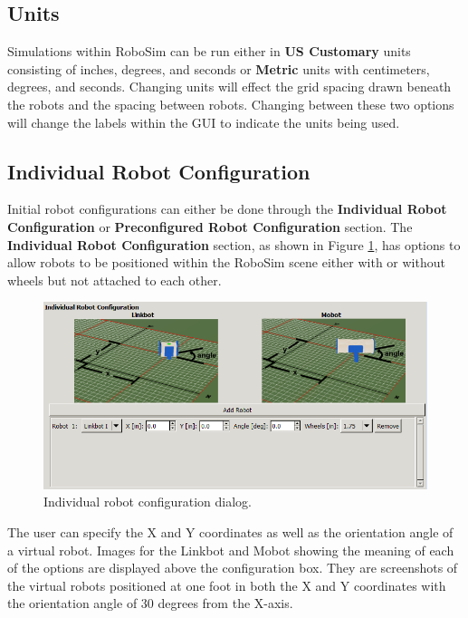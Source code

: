 \documentclass{article}
\begin{document}
\subsection{Units}
\label{sec:units}
Simulations within RoboSim can be run either in {\bf US Customary} units
consisting of inches, degrees, and seconds or {\bf Metric} units with
centimeters, degrees, and seconds.  Changing units will effect the grid spacing
drawn beneath the robots and the spacing between robots.  Changing between these
two options will change the labels within the GUI to indicate the units being
used.


\subsection{Individual Robot Configuration}
Initial robot configurations can either be done through the {\bf Individual
Robot Configuration} or {\bf Preconfigured Robot Configuration} section.  The
{\bf Individual Robot Configuration} section, as shown in Figure
\ref{fig:config}, has options to allow robots to be positioned within the
RoboSim scene either with or without wheels but not attached to each other.
\begin{figure}[H]
	\begin{center}
		\includegraphics[width=6in]{images/gui_individual}
	\end{center}
	\caption{Individual robot configuration dialog.}
	\label{fig:config}
\end{figure}

The user can specify the X and Y coordinates  as well as the orientation angle
of a virtual robot.  Images for the Linkbot and Mobot showing the meaning of
each of the options are displayed above the configuration box.  They are
screenshots of the virtual robots positioned at one foot in both the X and Y
coordinates with the orientation angle of 30 degrees from the X-axis.
\end{document}
